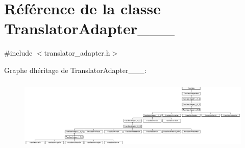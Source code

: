\hypertarget{class_translator_adapter__1__8__0}{}\section{Référence de la classe Translator\+Adapter\+\_\+\_\+\_}
\label{class_translator_adapter__1__8__0}


{\ttfamily \#include $<$translator\+\_\+adapter.\+h$>$}

Graphe d\textquotesingle{}héritage de Translator\+Adapter\+\_\+\_\+\_\+:\begin{figure}[H]
\begin{center}
\leavevmode
\includegraphics[height=3.414634cm]{class_translator_adapter__1__8__0}
\end{center}
\end{figure}
